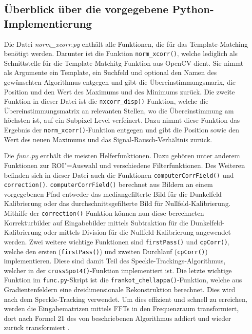 \subsection{Überblick über die vorgegebene Python-Implementierung}

Die Datei \textit{norm\_xcorr.py} enthält alle Funktionen, die für das Template-Matching benötigt werden. Darunter ist die Funktion \texttt{norm\_xcorr()}, welche lediglich als Schnittstelle für die Template-Matchitg Funktion aus OpenCV dient. Sie nimmt als Argumente ein Template, ein Suchfeld und optional den Namen des gewünschten Algorithmus entgegen und gibt die Übereinstimmungsmarix, die Position und den Wert des Maximums und des Minimums zurück. Die zweite Funktion in dieser Datei ist die \texttt{nxcorr\_disp()}-Funktion, welche die Übereinstimmungsmatrix an relevanten Stellen, wo die Übereinstimmung am höchsten ist, auf ein Subpixel-Level verfeinert. Dazu nimmt diese Funktion das Ergebnis der \texttt{norm\_xcorr()}-Funktion entgegen und gibt die Position sowie den Wert des neuen Maximums und das Signal-Rausch-Verhältnis zurück. 

Die \textit{func.py} enthält die meisten Helferfunktionen. Dazu gehören unter anderem Funktionen zur \gls{ROI}"=Auswahl und verschiedene Filterfunktionen. Des Weiteren befinden sich in dieser Datei auch die Funktionen \texttt{computerCorrField()} und \texttt{correction()}. \texttt{computerCorrField()} berechnet aus Bildern an einem vorgegebenen Pfad entweder das mediangefilterte Bild für die Dunkelfeld-Kalibrierung oder das durchschnittsgefilterte Bild für Nullfeld-Kalibrierung. Mithilfe der \texttt{correction()} Funktion können nun diese berechneten Korrekturbilder auf Eingabebilder mittels Subtraktion für die Dunkelfeld-Kalibrierung oder mittels Division für die Nullfeld-Kalibrierung angewendet werden. Zwei weitere wichtige Funktionen sind \texttt{firstPass()} und \texttt{cpCorr()}, welche den ersten (\texttt{firstPass()}) und zweiten Durchlauf (\texttt{cpCorr()}) implementieren. Diese sind damit Teil des Speckle-Trackings-Algorithmus, welcher in der \texttt{crossSpot4()}-Funktion implementiert ist. Die letzte wichtige Funktion im \texttt{func.py}-Skript ist die \texttt{frankot\_chellappa()}-Funktion, welche aus Gradientenfeldern eine dreidimensionale Rekonstruktion berechnet. Dies wird nach dem Speckle-Tracking verwendet. Um dies effizient und schnell zu erreichen, werden die Eingabematrizen mittels \glspl{FFT} in den Frequenzraum transformiert, dort nach Formel 21 des von \citeauthor{FC88} beschriebenen Algorithmus addiert und wieder zurück transformiert . 

